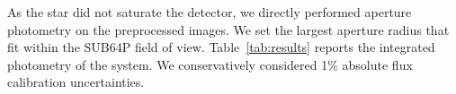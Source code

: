 \documentclass[longauth]{aa}
\newcommand{\vc}[1]{#1}
\newcommand{\new}[1]{#1}
\begin{document}
    As the star did not saturate \new{the detector}, %
    we directly performed aperture photometry on the preprocessed images. We set the largest aperture radius that fit within the SUB64P field of view. %
    Table~\ref{tab:results} reports the integrated photometry of the system. We conservatively 
    considered 1\% absolute flux calibration uncertainties. %

    
\end{document}

